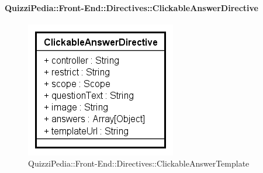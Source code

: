 	\paragraph{QuizziPedia::Front-End::Directives::ClickableAnswerDirective}
		
		\label{QuizziPedia::Front-End::Directives::ClickableAnswerDirective}
		
		\begin{figure}[ht]
			\centering
			\includegraphics[scale=0.80,keepaspectratio]{UML/Classi/Front-End/QuizziPedia_Front-end_Templates_ClickableAnswerTemplate.png}
			\caption{QuizziPedia::Front-End::Directives::ClickableAnswerTemplate}
		\end{figure} \FloatBarrier
		
